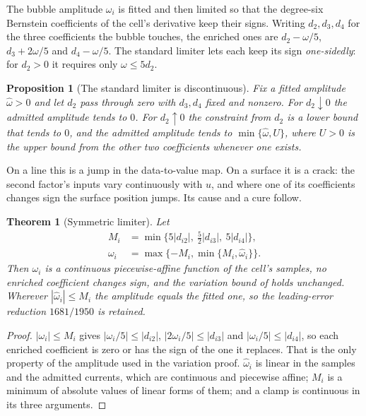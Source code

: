 \documentclass[journal]{IEEEtran}
\newtheorem{theorem}{Theorem}
\newtheorem{proposition}{Proposition}
\begin{document}
The bubble amplitude $\omega_i$ is fitted and then limited so that the
degree-six Bernstein coefficients of the cell's derivative keep their
signs. Writing $d_2,d_3,d_4$ for the three coefficients the bubble
touches, the enriched ones are $d_2-\omega/5$, $d_3+2\omega/5$ and
$d_4-\omega/5$. The standard limiter \cite{convpaper} lets each keep its
sign \emph{one-sidedly}: for $d_2>0$ it requires only $\omega\le5d_2$.

\begin{proposition}[The standard limiter is discontinuous]
Fix a fitted amplitude $\widehat\omega>0$ and let $d_2$ pass through zero
with $d_3,d_4$ fixed and nonzero. For $d_2\downarrow0$ the admitted
amplitude tends to $0$. For $d_2\uparrow0$ the constraint from $d_2$ is a
lower bound that tends to $0$, and the admitted amplitude tends to
$\min\{\widehat\omega,U\}$, where $U>0$ is the upper bound from the other
two coefficients whenever one exists.
\end{proposition}

On a line this is a jump in the data-to-value map. On a surface it is a
crack: the second factor's inputs vary continuously with $u$, and where
one of its coefficients changes sign the surface position jumps. Its cause and a cure follow.

\begin{theorem}[Symmetric limiter]
\label{thm:symmetric}
Let
\begin{align}
 M_i&=\min\{5|d_{i2}|,\ \tfrac52|d_{i3}|,\ 5|d_{i4}|\},\nonumber\\
 \omega_i&=\max\{-M_i,\min\{M_i,\widehat\omega_i\}\}.
 \label{eq:symmetric}
\end{align}
Then $\omega_i$ is a continuous piecewise-affine function of the cell's
samples, no enriched coefficient changes sign, and the variation bound of
\cite{convpaper} holds unchanged. Wherever
$|\widehat\omega_i|\le M_i$ the amplitude equals the fitted one, so the
leading-error reduction $1681/1950$ is retained.
\end{theorem}

\begin{proof}
$|\omega_i|\le M_i$ gives $|\omega_i/5|\le|d_{i2}|$,
$|2\omega_i/5|\le|d_{i3}|$ and $|\omega_i/5|\le|d_{i4}|$, so each
enriched coefficient is zero or has the sign of the one it replaces. That
is the only property of the amplitude used in the variation proof.
$\widehat\omega_i$ is linear in the samples and the admitted currents,
which are continuous and piecewise affine; $M_i$ is a minimum of absolute
values of linear forms of them; and a clamp is continuous in its three
arguments.
\end{proof}
\end{document}
